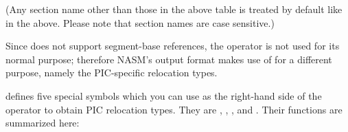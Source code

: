 (Any section name other than those in the above table is treated by
default like  in the above. Please note that section
names are case sensitive.)


Since  does not support segment-base references, the 
operator is not used for its normal purpose; therefore NASM's 
output format makes use of  for a different purpose, namely the
PIC-specific relocation types.

 defines five special symbols which you can use as the
right-hand side of the  operator to obtain PIC relocation
types. They are , , ,
 and . Their functions are summarized here:


